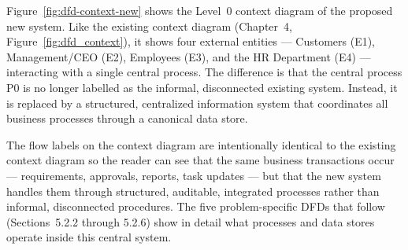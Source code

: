 \documentclass[12pt,a4paper]{report}
\begin{document}
Figure~\ref{fig:dfd-context-new} shows the Level~0 context diagram of the proposed
new system. Like the existing context diagram (Chapter~4,
Figure~\ref{fig:dfd_context}), it shows four external entities --- Customers (E1),
Management/CEO (E2), Employees (E3), and the HR Department (E4) --- interacting with
a single central process. The difference is that the central process P0 is no longer
labelled as the informal, disconnected existing system. Instead, it is replaced by
a structured, centralized information system that coordinates all business processes
through a canonical data store.

The flow labels on the context diagram are intentionally identical to the existing
context diagram so the reader can see that the same business transactions occur ---
requirements, approvals, reports, task updates --- but that the new system handles
them through structured, auditable, integrated processes rather than informal,
disconnected procedures. The five problem-specific DFDs that follow (Sections~5.2.2
through 5.2.6) show in detail what processes and data stores operate inside this
central system.
\end{document}
